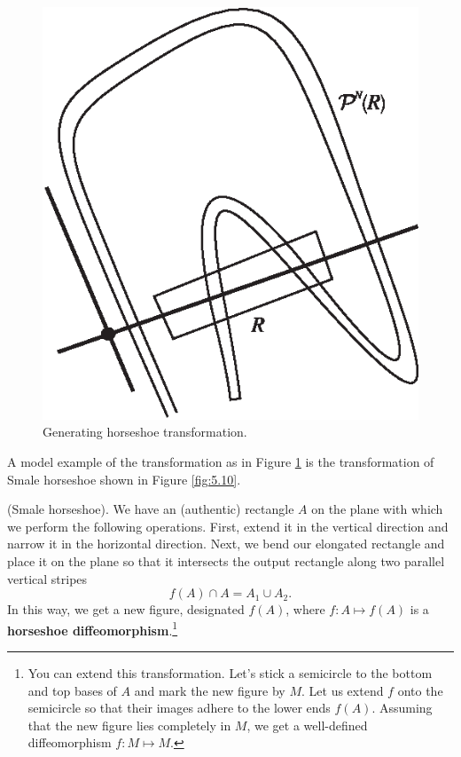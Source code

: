\begin{figure}[!ht]
	\centering
	\includegraphics [scale=1.4]{jtr59}
	\caption{Generating horseshoe transformation.}
	\label{fig:5.9}
\end{figure}

A model example of the transformation as in Figure \ref{fig:5.9} is the transformation of Smale horseshoe shown in Figure \ref{fig:5.10}.

\begin{definition} (Smale horseshoe).
	We have an (authentic) rectangle $A$ on the plane with which we perform the following operations. First, extend it in the vertical direction and narrow it in the horizontal direction. Next, we bend our elongated rectangle and place it on the plane so that it intersects the output rectangle along two parallel vertical stripes
	$$
	f(A)\cap A=A_{1}\cup A_{2}.
	$$
	In this way, we get a new figure, designated $f(A)$, where $f:A\longmapsto f(A)$ is a \textbf{horseshoe diffeomorphism}.\footnote{You can extend this transformation. Let's stick  a semicircle to the bottom and top bases of $A$ and mark the new figure by $M$. Let us extend $f$ onto the semicircle so that their images adhere to the lower ends $f(A)$. Assuming that the new figure lies completely in $M$, we get a well-defined diffeomorphism $f:M\longmapsto M$.}
\end{definition}

